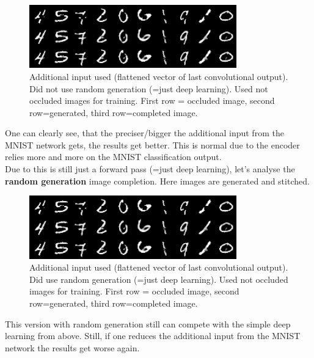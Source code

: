 \documentclass[
     11pt,         %
     a4paper,      %
     oneside,
     ]{article}
\begin{document}
\begin{figure}[H]
  \begin{center}
    \includegraphics[width=0.8\textwidth]{presentation_results/VAE/MNIST-VAE-useRandom_true-useMNIST_true-VAERepresentation_1-useOccludedForTrain_false.png}
    \caption{Additional input used (flattened vector of last convolutional output). Did not use random generation (=just deep learning). Used not occluded images for training. First row = occluded image, second row=generated, third row=completed image.}
  \end{center}
\end{figure}
One can clearly see, that the preciser/bigger the additional input from the MNIST network gets, the results get better. This is normal due to the encoder relies more and more on the MNIST classification output. \\
Due to this is still just a forward pass (=just deep learning), let's analyse the \textbf{random generation} image completion. Here images are generated and stitched.
\begin{figure}[H]
  \begin{center}
    \includegraphics[width=0.8\textwidth]{presentation_results/VAE/MNIST-VAE-useRandom_true-useMNIST_true-VAERepresentation_1-useOccludedForTrain_false.png}
    \caption{Additional input used (flattened vector of last convolutional output). Did use random generation (=just deep learning). Used not occluded images for training. First row = occluded image, second row=generated, third row=completed image.}
  \end{center}
\end{figure}
This version with random generation still can compete with the simple deep learning from above. Still, if one reduces the additional input from the MNIST network the results get worse again.
\end{document}
